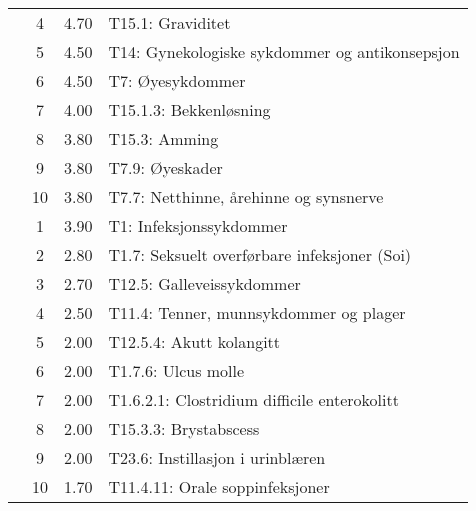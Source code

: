 \begin{table}[htbp]
\begin{tabular}{c c c l}
     & 4 & 4.70 & T15.1: Graviditet \\
     & 5 & 4.50 & T14: Gynekologiske sykdommer og antikonsepsjon \\
     & 6 & 4.50 & T7: Øyesykdommer \\
     & 7 & 4.00 & T15.1.3: Bekkenløsning \\
     & 8 & 3.80 & T15.3: Amming \\
     & 9 & 3.80 & T7.9: Øyeskader \\
     & 10 & 3.80 & T7.7: Netthinne, årehinne og synsnerve \\
	\addlinespace
    8 & 1 & 3.90 & T1: Infeksjonssykdommer \\
     & 2 & 2.80 & T1.7: Seksuelt overførbare infeksjoner (Soi) \\
     & 3 & 2.70 & T12.5: Galleveissykdommer \\
     & 4 & 2.50 & T11.4: Tenner, munnsykdommer og plager \\
     & 5 & 2.00 & T12.5.4: Akutt kolangitt \\
     & 6 & 2.00 & T1.7.6: Ulcus molle \\
     & 7 & 2.00 & T1.6.2.1: Clostridium difficile enterokolitt \\
     & 8 & 2.00 & T15.3.3: Brystabscess \\
     & 9 & 2.00 & T23.6: Instillasjon i urinblæren \\
     & 10 & 1.70 & T11.4.11: Orale soppinfeksjoner \\
	\bottomrule
\end{tabular}
\end{table}

